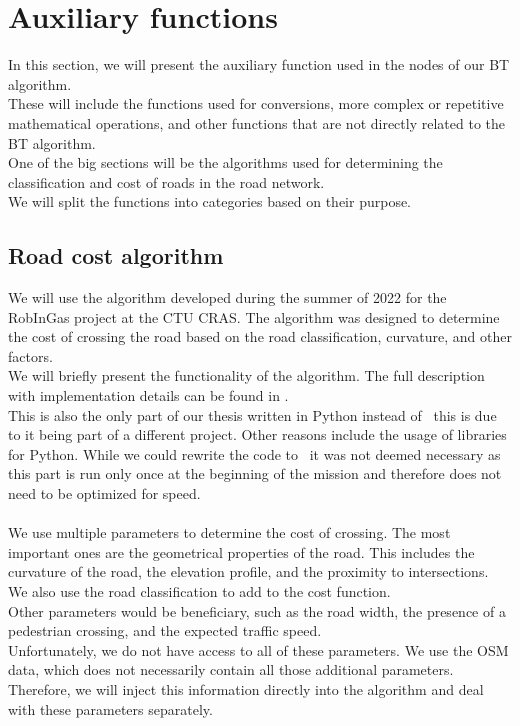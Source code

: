 \section{Auxiliary functions}
    In this section, we will present the auxiliary function used in the nodes of our BT algorithm.\\
    These will include the functions used for conversions, more complex or repetitive mathematical operations, and other functions that are not directly related to the BT algorithm.\\
    One of the big sections will be the algorithms used for determining the classification and cost of roads in the road network.\\
    We will split the functions into categories based on their purpose.

    \subsection{Road cost algorithm}
        \label{sec:road_cost}
        We will use the algorithm developed during the summer of 2022 for the RobInGas project at the CTU CRAS. The algorithm was designed to determine the cost of crossing the road based on the road classification, curvature, and other factors.\\
        We will briefly present the functionality of the algorithm. The full description with implementation details can be found in \cite{Road_cost_docs}.\\
        This is also the only part of our thesis written in Python instead of \CC\ this is due to it being part of a different project. Other reasons include the usage of libraries for Python. While we could rewrite the code to \CC\ it was not deemed necessary as this part is run only once at the beginning of the mission and therefore does not need to be optimized for speed.\\
        \\
            We use multiple parameters to determine the cost of crossing. The most important ones are the geometrical properties of the road. This includes the curvature of the road, the elevation profile, and the proximity to intersections. We also use the road classification to add to the cost function.\\
            Other parameters would be beneficiary, such as the road width, the presence of a pedestrian crossing, and the expected traffic speed.\\
            Unfortunately, we do not have access to all of these parameters. We use the OSM data, which does not necessarily contain all those additional parameters. Therefore, we will inject this information directly into the algorithm and deal with these parameters separately.\\
